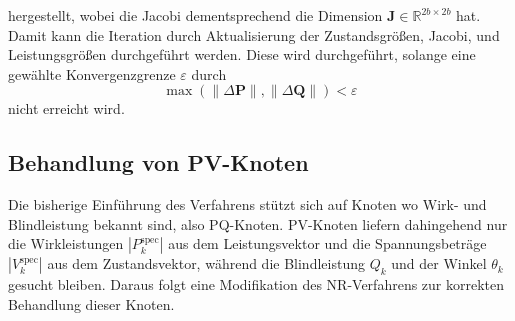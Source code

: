 hergestellt, wobei die Jacobi dementsprechend die Dimension $\mathbf{J} \in \mathbb{R}^{2b \times 2b}$ hat.
Damit kann die Iteration durch Aktualisierung der Zustandsgrößen, Jacobi, und Leistungsgrößen durchgeführt werden. 
Diese wird durchgeführt, solange eine gewählte Konvergenzgrenze $\varepsilon$ durch
\begin{equation}
	\label{eq:convergence_limit}
	\max(\|\Delta \mathbf{P}\|, \|\Delta \mathbf{Q}\|) < \varepsilon
\end{equation}
nicht erreicht wird.\\



\subsection{Behandlung von PV-Knoten}
\label{subsec:nr_pv}

Die bisherige Einführung des Verfahrens stützt sich auf Knoten wo Wirk- und Blindleistung bekannt sind, also PQ-Knoten.
PV-Knoten liefern dahingehend nur die Wirkleistungen $|P_k^{\text{spec}}|$ aus dem Leistungsvektor und die Spannungsbeträge 
$|V_k^{\text{spec}}|$ aus dem Zustandsvektor, während die Blindleistung $Q_k$ und der Winkel $\theta_k$ gesucht bleiben.
Daraus folgt eine Modifikation des NR-Verfahrens zur korrekten Behandlung dieser Knoten.\\


